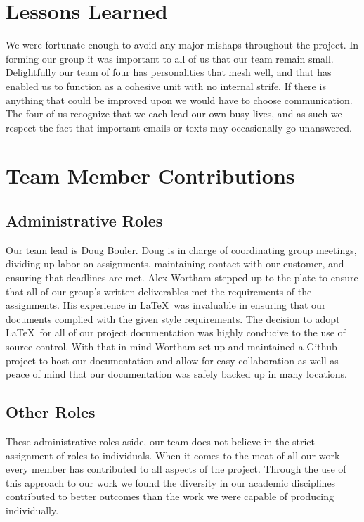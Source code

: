 \documentclass[12pt,letterpaper]{article}
\begin{document}
\section{Lessons Learned}


We were fortunate enough to avoid any major mishaps throughout the project. In
forming our group it was important to all of us that our team remain small.
Delightfully our team of four has personalities that mesh well, and that has
enabled us to function as a cohesive unit with no internal strife.
If there is anything that could be improved upon we would have to choose
communication.  The four of us recognize that we each lead our own busy lives,
and as such we respect the fact that important emails or texts may occasionally
go unanswered.


\section{Team Member Contributions}

\subsection{Administrative Roles}
Our team lead is Doug Bouler. Doug is in charge of coordinating group
meetings, dividing up labor on assignments, maintaining contact with our
customer, and ensuring that deadlines are met.  Alex Wortham stepped up to the
plate to ensure that all of our group's written deliverables met the
requirements of the assignments.  His experience in \LaTeX\ was invaluable in
ensuring that our documents complied with the given style requirements.  The
decision to adopt \LaTeX\ for all of our project documentation was highly
conducive to the use of source control.  With that in mind Wortham set up and
maintained a Github project to host our documentation and allow for easy
collaboration as well as peace of mind that our documentation was safely backed
up in many locations.

\subsection{Other Roles}
These administrative roles aside, our team does not
believe in the strict assignment of roles to individuals.  When it comes to the
meat of all our work every member has contributed to all aspects of the project.
Through the use of this approach to our work we found the diversity in our
academic disciplines contributed to better outcomes than the work we were
capable of producing individually. 
\end{document}
